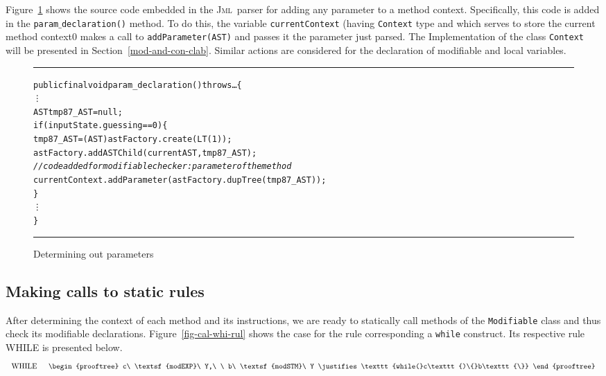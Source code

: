 \documentclass[a4paper]{llncs}
\newcommand{\jml}{\textsc{Jml}}
\begin{document}
Figure~\ref{fig-out-par} shows the source code embedded in the
\jml~parser for adding any parameter to a method
context. Specifically, this code is added in the
\texttt{param$\_$declaration()} method. To do this, the variable
\texttt{currentContext} (having \texttt{Context} type and which serves
to store the current method context0 makes a call to
\texttt{addParameter(AST)} and passes it the parameter just
parsed. The Implementation of the class \texttt{Context} will be
presented in
Section~\ref{mod-and-con-clab}. Similar actions are
considered for the declaration of modifiable and local variables.
\begin{figure}[tbh]
\rule{\linewidth}{0.25mm}
\begin{alltt}
   public final void param_declaration() throws \dots \verb!{! 
      \vdots
      AST tmp87_AST = null;
      if(inputState.guessing == 0) \verb!{!
         tmp87_AST = (AST)astFactory.create(LT(1));
         astFactory.addASTChild(currentAST, tmp87_AST);
         {\it//code added for modifiable checker: parameter of the method}
         currentContext.addParameter(astFactory.dupTree(tmp87_AST));
      \verb!}!
      \vdots
   \verb!}!
\end{alltt}
\caption{Determining out parameters}
\label{fig-out-par}
\rule{\linewidth}{0.25mm}
\end{figure}




\subsection{Making calls to static rules}
\label{mak-cal-sta-rul}
After determining the context of each method and its instructions, we
are ready to statically call methods of the \texttt{Modifiable} class
and thus check its modifiable declarations. Figure~\ref{fig-cal-whi-rul}
shows the case for the rule corresponding a \texttt{while}
construct. Its
respective rule \textup{WHILE} is presented below.
\[
\begin{tabular}{ll}
WHILE\,\, & 
\begin{prooftree}
c\ \textsf{modEXP}\ Y,\ \ b\ \textsf{modSTM}\ Y
\justifies
\texttt{while(}c\texttt{)\{}b\texttt{\}}
\end{prooftree}
\end{tabular}
\]
\end{document}
